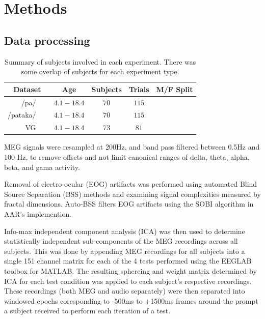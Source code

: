 \documentclass[a4paper]{article}
\begin{document}
\section{Methods}


\subsection{Data processing}

\begin{table}[t]
  \caption{Summary of subjects involved in each experiment. There was some overlap of subjects for each experiment type.}
  \label{tab:subjects}
  \centering
  \begin{tabular}{ r@{}c c c c }
    \toprule
    \multicolumn{1}{c}{\textbf{Dataset}} & \multicolumn{1}{c}{\textbf{Age}} & \multicolumn{1}{c}{\textbf{Subjects}} & \multicolumn{1}{c}{\textbf{Trials}}  & \multicolumn{1}{c}{\textbf{M/F Split}} \\
    \midrule
    /pa/~~~                    & $4.1-18.4$   &   $70$   &   $115$ \\
    /pataka/~~~                & $4.1-18.4$   &   $70$   &   $115$ \\
    VG~~~                      & $4.1-18.4$   &   $73$   &   $81$  \\
    \bottomrule
  \end{tabular}
\end{table}

MEG signals were resampled at 200Hz, and band pass filtered between 0.5Hz and 100 Hz, to remove offsets and not limit canonical ranges of delta, theta, alpha, beta, and gama activity. 

Removal of electro-ocular (EOG) artifacts was performed using automated Blind Source Separation (BSS) methods and examining signal complexities measured by fractal dimensions. Auto-BSS filters EOG artifacts using the SOBI algorithm in AAR's implemention.

Info-max independent component analysis (ICA) \cite{Bell1995} was then used to determine statistically independent sub-components of the MEG recordings across all subjects. This was done by appending MEG recordings for all subjects into a single 151 channel matrix for each of the 4 tests performed using the EEGLAB toolbox \cite{Delorme04eeglab} for MATLAB. The resulting sphereing and weight matrix determined by ICA for each test condition was applied to each subject's respective recordings. These recordings (both MEG and audio separately) were then separated into windowed epochs coresponding to -500ms to +1500ms frames around the prompt a subject received to perform each iteration of a test.
\end{document}
